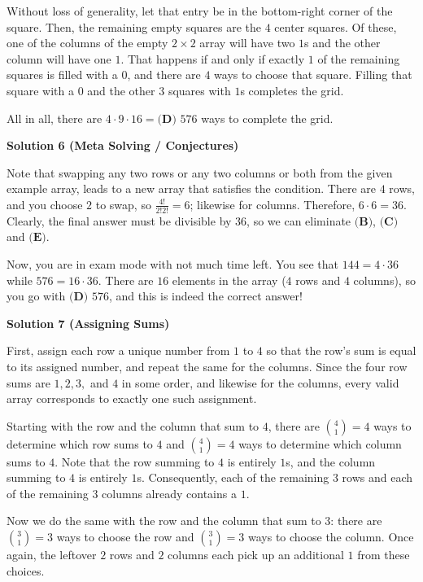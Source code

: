 \begin{enumerate}
 Without loss of generality, let that entry be in the bottom-right corner of the square. Then, the remaining empty squares are the $4$ center squares. Of these, one of the columns of the empty $2\times2$ array will have two $1$s and the other column will have one $1.$ That happens if and only if exactly $1$ of the remaining squares is filled with a $0$, and there are $4$ ways to choose that square. Filling that square with a $0$ and the other $3$ squares with $1$s completes the grid.

 All in all, there are $4\cdot9\cdot16=\boxed{\textbf{(D) }576}$ ways to complete the grid.

 



\textbf{Solution 6 (Meta Solving / Conjectures)}

Note that swapping any two rows or any two columns or both from the given example array, leads to a new array that satisfies the condition. There are $4$ rows, and you choose $2$ to swap, so $\frac{4!}{2!2!} = 6$; likewise for columns. Therefore, $6\cdot6 = 36$. Clearly, the final answer must be divisible by $36$, so we can eliminate $\textbf{(B)}$, $\textbf{(C)}$ and $\textbf{(E)}$. 

 Now, you are in exam mode with not much time left. You see that $144 = 4\cdot36$ while $576 = 16\cdot36$. There are $16$ elements in the array ($4$ rows and $4$ columns), so you go with $\boxed{\textbf{(D) }576}$, and this is indeed the correct answer!

 



\textbf{Solution 7 (Assigning Sums)}

First, assign each row a unique number from $1$ to $4$ so that the row's sum is equal to its assigned number, and repeat the same for the columns. Since the four row sums are $1,2,3,$ and $4$ in some order, and likewise for the columns, every valid array corresponds to exactly one such assignment.

 Starting with the row and the column that sum to $4$, there are $\binom41=4$ ways to determine which row sums to $4$ and $\binom41=4$ ways to determine which column sums to $4$. Note that the row summing to $4$ is entirely $1$s, and the column summing to $4$ is entirely $1$s. Consequently, each of the remaining $3$ rows and each of the remaining $3$ columns already contains a $1$.

 Now we do the same with the row and the column that sum to $3$: there are $\binom31=3$ ways to choose the row and $\binom31=3$ ways to choose the column. Once again, the leftover $2$ rows and $2$ columns each pick up an additional $1$ from these choices.


\end{enumerate}
